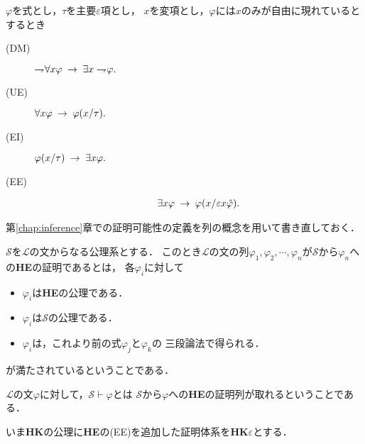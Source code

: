 	\begin{screen}
		\begin{logicalaxm}[{\bf HE}の公理(量化)]
			$\varphi$を式とし，$\tau$を主要$\varepsilon$項とし，
			$x$を変項とし，$\varphi$には$x$のみが自由に現れているとするとき
			\begin{description}
				\item[(DM)] $\rightharpoondown\hspace{-0.25em} \forall x \varphi
					\hspace{0.25em}\rightarrow\hspace{0.25em} \exists x \rightharpoondown\hspace{-0.25em} \varphi.$
				
				\item[(UE)] $\forall x \varphi \hspace{0.25em}\rightarrow\hspace{0.25em} \varphi(x/\tau).$
				
				\item[(EI)] $\varphi(x/\tau) \hspace{0.25em}\rightarrow\hspace{0.25em} \exists x \varphi.$
				
				\item[(EE)] 
					\begin{align}
						\exists x \varphi \hspace{0.25em}\rightarrow\hspace{0.25em} \varphi(x/\varepsilon x \hat{\varphi}).
					\end{align}
			\end{description}
		\end{logicalaxm}
	\end{screen}
	
	第\ref{chap:inference}章での証明可能性の定義を列の概念を用いて書き直しておく．
	
	\begin{screen}
		\begin{metadfn}[{\bf HE}における証明]
			$\mathscr{S}$を$\mathcal{L}$の文からなる公理系とする．
			このとき$\mathcal{L}$の文の列$\varphi_{1},\varphi_{2},\cdots,
			\varphi_{n}$が$\mathscr{S}$から$\varphi_{n}$への{\bf HE}の証明であるとは，
			各$\varphi_{i}$に対して
			\begin{itemize}
				\item $\varphi_{i}$は{\bf HE}の公理である．
				\item $\varphi_{i}$は$\mathscr{S}$の公理である．
				\item $\varphi_{i}$は，これより前の式$\varphi_{j}$と$\varphi_{k}$の
					三段論法で得られる．
			\end{itemize}
			が満たされているということである．
		\end{metadfn}
	\end{screen}
	
	$\mathcal{L}$の文$\varphi$に対して，$\mathscr{S} \vdash \varphi$とは
	$\mathscr{S}$から$\varphi$への{\bf HE}の証明列が取れるということである．
	
	いま{\bf HK}の公理に{\bf HE}の(EE)を追加した証明体系を{\bf HK$\varepsilon$}とする．
	
